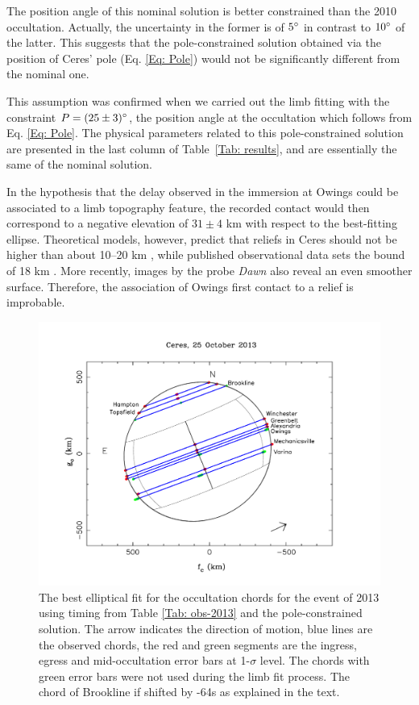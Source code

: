 \documentclass[useAMS,usenatbib]{mn2e}
\begin{document}
The position angle of this nominal solution is better constrained than the 2010 occultation. Actually, the uncertainty in the former is of $5\hbox{$^\circ$}$ in contrast to $10\hbox{$^\circ$}$ of the latter. This suggests that the pole-constrained solution obtained via the position of Ceres' pole (Eq. \ref{Eq: Pole}) would not be significantly different from the nominal one.

This assumption was confirmed when we carried out the limb fitting with the constraint $P = (25 \pm 3)\hbox{$^\circ$}$, the position angle at the occultation which follows from Eq. \ref{Eq: Pole}. The physical parameters related to this pole-constrained solution are presented in the last column of Table~\ref{Tab: results}, and are essentially the same of the nominal solution.

In the hypothesis that the delay observed in the immersion at Owings could be associated to a limb topography feature, the recorded contact would then correspond to a negative elevation of $31 \pm 4$ km with respect to the best-fitting ellipse. Theoretical models, however, predict that reliefs in Ceres should not be higher than about 10--20 km \citep{Johnson1973}, while published observational data sets the bound of 18 km \citep{Carry2008}. More recently, images by the probe \textit{Dawn} also reveal an even smoother surface. Therefore, the association of Owings first contact to a relief is improbable.

\begin{figure}
\includegraphics[scale=0.36]{figures/Ceres_2013_sphere.pdf}
\caption{The best elliptical fit for the occultation chords for the event of 2013 using timing from Table \ref{Tab: obs-2013} and the pole-constrained solution.  The arrow indicates the direction of motion, blue lines are the observed chords, the red and green segments are the ingress, egress and mid-occultation error bars at 1-$\sigma$ level. The chords with green error bars were not used during the limb fit process. The chord of Brookline if shifted by -64s as explained in the text.\label{Fig: Ceres-2013-body}}
\end{figure}
\end{document}
